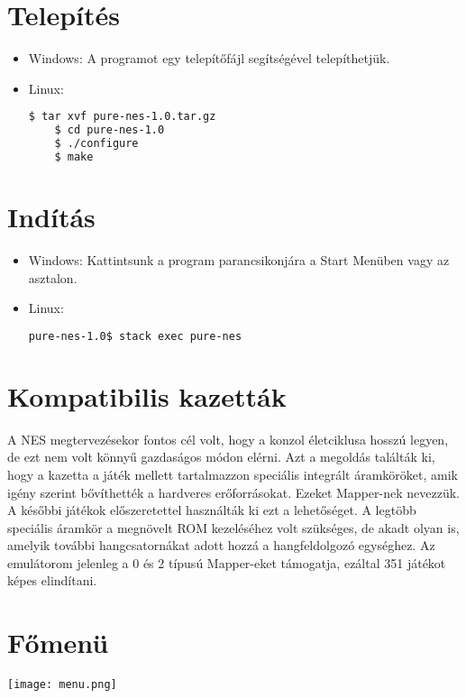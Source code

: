 \section{Telepítés}

\begin{itemize}
	\item Windows: A programot egy telepítőfájl segítségével telepíthetjük.
	\item Linux:
	\begin{lstlisting}[language=bash]
	$ tar xvf pure-nes-1.0.tar.gz
	$ cd pure-nes-1.0
	$ ./configure
	$ make
	\end{lstlisting}
\end{itemize}

\section{Indítás}
\begin{itemize}
	\item Windows: Kattintsunk a program parancsikonjára a Start Menüben vagy az asztalon.
	\item Linux:
	\begin{lstlisting}[language=bash]
	pure-nes-1.0$ stack exec pure-nes
	\end{lstlisting}
\end{itemize}


\section{Kompatibilis kazetták}

A NES megtervezésekor fontos cél volt, hogy a konzol életciklusa hosszú legyen, de ezt nem volt könnyű gazdaságos módon elérni. Azt a megoldás találták ki, hogy a kazetta a játék mellett tartalmazzon speciális integrált áramköröket, amik igény szerint bővíthették a hardveres erőforrásokat. Ezeket Mapper-nek nevezzük. A későbbi játékok előszeretettel használták ki ezt a lehetőséget. A legtöbb speciális áramkör a megnövelt ROM kezeléséhez volt szükséges, de akadt olyan is, amelyik további hangcsatornákat adott hozzá a hangfeldolgozó egységhez. Az emulátorom jelenleg a 0 és 2 típusú Mapper-eket támogatja, ezáltal 351 játékot képes elindítani.      

\section{Főmenü}

\begin{center}
	\texttt{[image: menu.png]}
\end{center}

